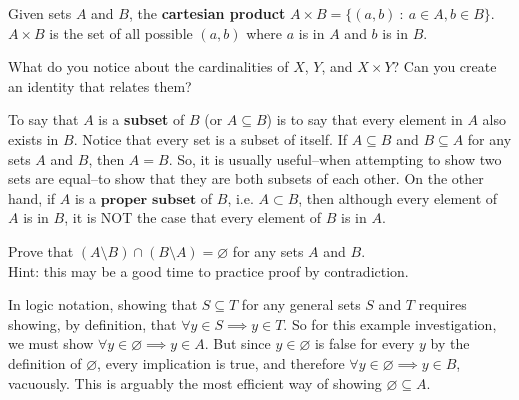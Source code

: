 \begin{definition}
    Given sets $A$ and $B$, the \textbf{cartesian product}  $A\times B = \{(a,b)\ :\ a\in A, b\in B\}$. $A\times B$ is the set of all possible $(a,b)$ where $a$ is in $A$ and $b$ is in $B$.
\end{definition}

\begin{exercise}
    What do you notice about the cardinalities of $X$, $Y$, and $X\times Y$? Can you create an identity that relates them?
\end{exercise}

To say that $A$ is a \textbf{subset} of $B$ (or $A\subseteq B$) is to say that every element in $A$ also exists in $B$. Notice that every set is a subset of itself. If $A\subseteq B$ and $B\subseteq A$ for any sets $A$ and $B$, then $A=B$. So, it is usually useful--when attempting to show two sets are equal--to show that they are both subsets of each other. On the other hand, if $A$ is a $\textbf{proper subset}$ of $B$, i.e. $A\subset B$, then although every element of $A$ is in $B$, it is NOT the case that every element of $B$ is in $A$. 

\begin{exercise}
    Prove that $(A\setminus B) \cap (B\setminus A) =\varnothing$ for any sets $A$ and $B$. \\ Hint: this may be a good time to practice proof by contradiction.

\end{exercise}


\begin{example}
    In logic notation, showing that $S\subseteq T$ for any general sets $S$ and $T$ requires showing, by definition, that $\forall y\in S \implies y\in T$. So for this example investigation, we must show $\forall y\in\varnothing \implies y\in A$. But since $y\in\varnothing$ is false for every $y$ by the definition of $\varnothing$, every implication is true, and therefore $\forall y\in\varnothing \implies y\in B$, vacuously. This is arguably the most efficient way of showing $\varnothing\subseteq A$.
\end{example}


